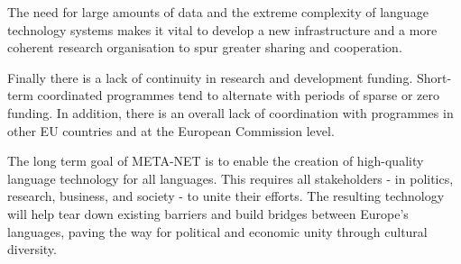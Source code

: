 \begin{multicols}{2}
The need for large amounts of data and the extreme complexity of language technology systems makes it vital to develop a new infrastructure and a more coherent research organisation to spur greater sharing and cooperation.

Finally there is a lack of continuity in research and development funding. Short-term coordinated programmes tend to alternate with periods of sparse or zero funding. In addition, there is an overall lack of coordination with programmes in other EU countries and at the European Commission level.

The long term goal of META-NET is to enable the creation of high-quality language technology for all languages. This requires all stakeholders - in politics, research, business, and society - to unite their efforts. The resulting technology will help tear down existing barriers and build bridges between Europe’s languages, paving the way for political and economic unity through cultural diversity. 
\end{multicols}

\clearpage


